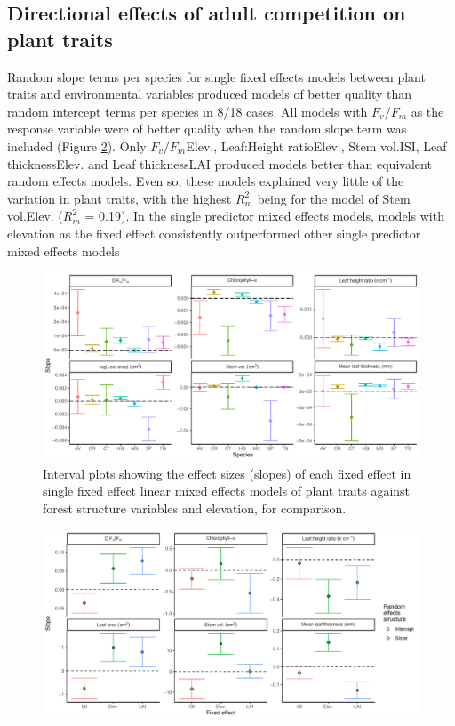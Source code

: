 \documentclass[a4paper, 11pt]{article}
\newcommand{\textapprox}{\raisebox{0.5ex}{\texttildelow}}
\begin{document}
\subsection{Directional effects of adult competition on plant traits}

Random slope terms per species for single fixed effects models between plant traits and environmental variables produced models of better quality than random intercept terms per species in 8/18 cases. All models with $F_v/F_m$ as the response variable were of better quality when the random slope term was included (Figure \ref{single_pred_slope}). Only $F_v/F_m$\textapprox{}Elev., Leaf:Height ratio\textapprox{}Elev., Stem vol.\textapprox{}ISI, Leaf thickness\textapprox{}Elev. and Leaf thickness\textapprox{}LAI produced models better than equivalent random effects models. Even so, these models explained very little of the variation in plant traits, with the highest $R^2_m$ being for the model of Stem vol.\textapprox{}Elev. ($R^2_m$ = 0.19). In the single predictor mixed effects models, models with elevation as the fixed effect consistently outperformed other single predictor mixed effects models

\begin{figure}[H]
\includegraphics[width=\textwidth]{traits_elev_slopes}
\centering
\caption{Interval plots showing the effect sizes (slopes) of each fixed effect in single fixed effect linear mixed effects models of plant traits against forest structure variables and elevation, for comparison.}
\label{traits_elev_slopes}
\end{figure}

\begin{figure}[H]
\includegraphics[width=\textwidth]{single_pred_slope}
\centering
\caption{}
\label{single_pred_slope}
\end{figure}
\end{document}
